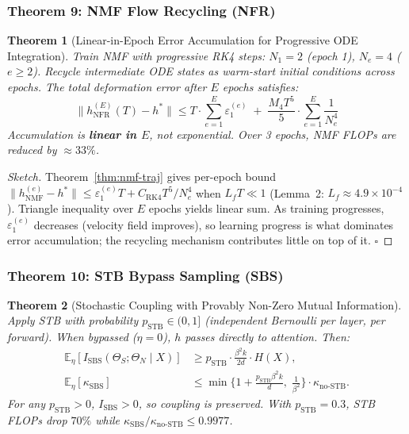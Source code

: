 \documentclass[conference]{IEEEtran}
\newtheorem{theorem}{Theorem}[section]
\begin{document}
\subsubsection{Theorem 9: NMF Flow Recycling (NFR)}

\begin{theorem}[Linear-in-Epoch Error Accumulation for Progressive ODE Integration]
\label{thm:nfr}
Train NMF with progressive RK4 steps: $N_1=2$ (epoch 1), $N_e=4$ ($e \geq 2$). Recycle intermediate ODE states as warm-start initial conditions across epochs. The total deformation error after $E$ epochs satisfies:
\begin{equation}
\|h_{\text{NFR}}^{(E)}(T) - h^*\| \leq T \cdot \sum_{e=1}^E \varepsilon_1^{(e)} \;+\; \frac{M_4 T^5}{5} \cdot \sum_{e=1}^E \frac{1}{N_e^4}
\end{equation}
Accumulation is \textbf{linear in $E$}, not exponential. Over 3 epochs, NMF FLOPs are reduced by $\approx 33\%$.
\end{theorem}

\begin{proof}[Sketch]
Theorem~\ref{thm:nmf-traj} gives per-epoch bound $\|h_{\text{NMF}}^{(e)} - h^*\| \leq \varepsilon_1^{(e)} T + C_{\text{RK4}} T^5/N_e^4$ when $L_f T \ll 1$ (Lemma~2: $L_f \approx 4.9\times 10^{-4}$). Triangle inequality over $E$ epochs yields linear sum. As training progresses, $\varepsilon_1^{(e)}$ decreases (velocity field improves), so learning progress is what dominates error accumulation; the recycling mechanism contributes little on top of it. $\square$
\end{proof}

\subsubsection{Theorem 10: STB Bypass Sampling (SBS)}

\begin{theorem}[Stochastic Coupling with Provably Non-Zero Mutual Information]
\label{thm:sbs}
Apply STB with probability $p_{\text{STB}} \in (0,1]$ (independent Bernoulli per layer, per forward). When bypassed ($\eta=0$), $h$ passes directly to attention. Then:
\begin{align}
\mathbb{E}_\eta[I_{\text{SBS}}(\Theta_S; \Theta_N \mid X)] &\geq p_{\text{STB}} \cdot \frac{\beta^2 k}{2d} \cdot H(X), \\
\mathbb{E}_\eta[\kappa_{\text{SBS}}] &\leq \min\!\Big\{1 + \frac{p_{\text{STB}}\beta^2 k}{d},\; \frac{1}{\beta^2}\Big\} \cdot \kappa_{\text{no-STB}}.
\end{align}
For any $p_{\text{STB}} > 0$, $I_{\text{SBS}} > 0$, so coupling is preserved. With $p_{\text{STB}}=0.3$, STB FLOPs drop $70\%$ while $\kappa_{\text{SBS}}/\kappa_{\text{no-STB}} \leq 0.9977$.
\end{theorem}
\end{document}
